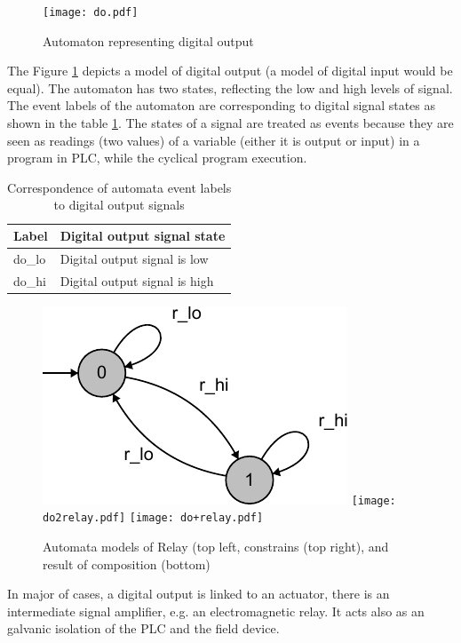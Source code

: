 \begin{figure}[t]
	\centering
	\texttt{[image: do.pdf]}
	\caption{Automaton representing digital output}
	\label{fig:do}
\end{figure}

The Figure \ref{fig:do} depicts a model of digital output (a
model of digital input would be equal). The automaton has two states,
reflecting the low and high levels of signal. The event labels of the automaton
are corresponding to digital signal states as shown in the table
\ref{tbl:do_events}. The states of a signal are treated as events because
they are seen as readings (two values) of a variable (either it is output or
input) in a program in PLC, while the cyclical program execution.

\begin{table}[t]
\caption{Correspondence of automata event labels to digital output signals}
\centering
	\begin{tabular}{l l}
	\\	
	Label & Digital output signal state\\
	\hline
	do\_lo & Digital output signal is low\\
	do\_hi & Digital output signal is high\\
	\end{tabular}
	\label{tbl:do_events}
\end{table}

\begin{figure}[t]
	\centering
	\includegraphics[scale=0.7]{./figures/relay.pdf}
	\texttt{[image: do2relay.pdf]} 
	\texttt{[image: do+relay.pdf]} 
	\caption{Automata models of Relay (top left, constrains (top right), and 
	result of composition (bottom)}
	\label{fig:do+relay}
\end{figure}

In major of cases, a digital output is linked to an actuator, there is an
intermediate signal amplifier, e.g. an electromagnetic relay. It acts also as an
galvanic isolation of the PLC and the field device. 

